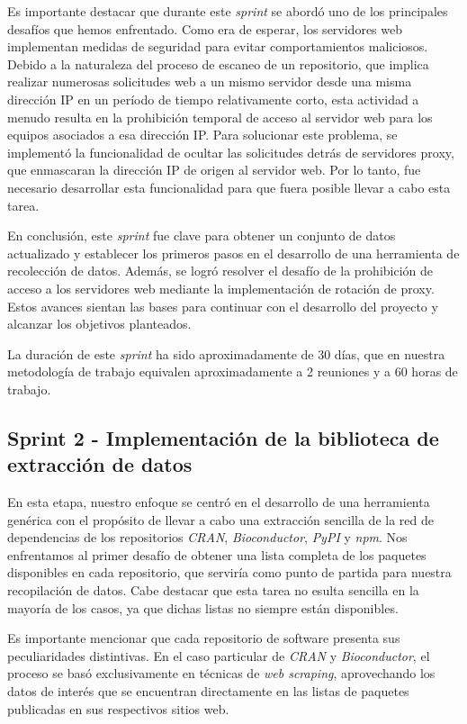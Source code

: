 Es importante destacar que durante este \textit{sprint} se abordó uno de los principales desafíos que hemos enfrentado. 
Como era de esperar, los servidores web implementan medidas de seguridad para evitar comportamientos maliciosos. Debido 
a la naturaleza del proceso de escaneo de un repositorio, que implica realizar numerosas solicitudes web a un mismo servidor 
desde una misma dirección IP en un período de tiempo relativamente corto, esta actividad a menudo resulta en la prohibición temporal de acceso al servidor web para los equipos asociados a esa dirección IP. Para solucionar este problema, se implementó la funcionalidad de ocultar las solicitudes detrás de servidores proxy, que enmascaran la dirección IP de origen al servidor web. Por lo tanto, fue necesario desarrollar esta funcionalidad para que fuera posible llevar a cabo esta tarea.

En conclusión, este \textit{sprint} fue clave para obtener un conjunto de datos actualizado y establecer los primeros 
pasos en el desarrollo de una herramienta de recolección de datos. Además, se logró resolver el desafío de la prohibición 
de acceso a los servidores web mediante la implementación de rotación de proxy. Estos avances sientan las bases para continuar con el desarrollo 
del proyecto y alcanzar los objetivos planteados.

La duración de este \textit{sprint} ha sido aproximadamente de 30 días, que en nuestra metodología de trabajo equivalen 
aproximadamente a 2 reuniones y a 60 horas de trabajo.

\subsection{Sprint 2 - Implementación de la biblioteca de extracción de datos}

En esta etapa, nuestro enfoque se centró en el desarrollo de una herramienta genérica con el propósito de llevar a cabo 
una extracción sencilla de la red de dependencias de los repositorios \textit{CRAN}, \textit{Bioconductor}, \textit{PyPI} 
y \textit{npm}. Nos enfrentamos al primer desafío de obtener una lista completa de los paquetes disponibles en cada 
repositorio, que serviría como punto de partida para nuestra recopilación de datos. Cabe destacar que esta tarea no 
esulta sencilla en la mayoría de los casos, ya que dichas listas no siempre están disponibles.

Es importante mencionar que cada repositorio de software presenta sus peculiaridades distintivas. En el caso particular 
de \textit{CRAN} y \textit{Bioconductor}, el proceso se basó exclusivamente en técnicas de \textit{web scraping}, 
aprovechando los datos de interés que se encuentran directamente en las listas de paquetes publicadas en sus respectivos 
sitios web.

